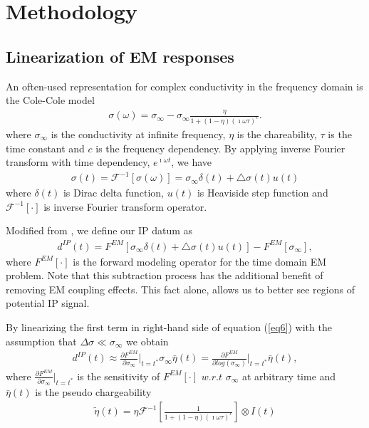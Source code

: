 \documentclass{segabs}
\begin{document}

\section*{Methodology}
\subsection*{Linearization of EM responses}
An often-used representation for complex conductivity in the frequency domain is the Cole-Cole model \cite[]{COLE}
\begin{eqnarray}
  \sigma(\omega) = \sigma_{\infty} - \sigma_{\infty}\frac{\eta}{1+(1-\eta)(\imath\omega\tau)^c}.
\end{eqnarray}
where $\sigma_{\infty}$ is the conductivity at infinite frequency, $\eta$ is the chareability, $\tau$ is the time constant and $c$ is the frequency dependency. By applying inverse Fourier transform with time dependency, $e^{\imath\omega t}$, we have
\begin{eqnarray}
  \sigma(t) = \mathscr{F}^{-1}[\sigma(\omega)] = \sigma_{\infty}\delta(t) + \triangle\sigma(t)u(t)
\end{eqnarray}
where $\delta(t)$ is Dirac delta function, $u(t)$ is Heaviside step function and $\mathscr{F}^{-1}[\cdot]$ is inverse Fourier transform operator.



Modified from \cite{routh2001}, we define our IP datum as
\begin{eqnarray}
  d^{IP}(t)  = F^{EM}[\sigma_{\infty}\delta(t)+\triangle\sigma(t)u(t)] - F^{EM}[\sigma_{\infty}],
  \label{eq6}
\end{eqnarray}
where $F^{EM}[\cdot]$ is the forward modeling operator for the time domain EM problem. Note that this subtraction process has the additional benefit of removing EM coupling effects. This fact alone, allows us to better see regions of potential IP signal.

By linearizing the first term in right-hand side of equation (\ref{eq6}) with the assumption that $\Delta \sigma \ll \sigma_{\infty}$ we obtain
\begin{eqnarray}
  d^{IP}(t)  \approx \frac{\partial F^{EM}}{\partial \sigma_{\infty}}\Big|_{t = t^{*}}\sigma_{\infty}\bar{\eta}(t)
  =  \frac{\partial F^{EM}}{\partial log(\sigma_{\infty})}\Big|_{t = t^{*}}\bar{\eta}(t),
  \label{eq7}
\end{eqnarray}
where $\frac{\partial F^{EM}}{\partial \sigma_{\infty}}\Big|_{t = t^{*}}$ is the sensitivity of $F^{EM}[\cdot]$ $w.r.t$ $\sigma_{\infty}$ at arbitrary time and $\bar{\eta}(t)$ is the pseudo chargeability
\begin{eqnarray}
  \tilde{\eta}(t) = \eta\mathscr{F}^{-1}[\frac{1}{1+(1-\eta)(\imath\omega\tau)^c}]\otimes I(t)
\end{eqnarray}
\end{document}
